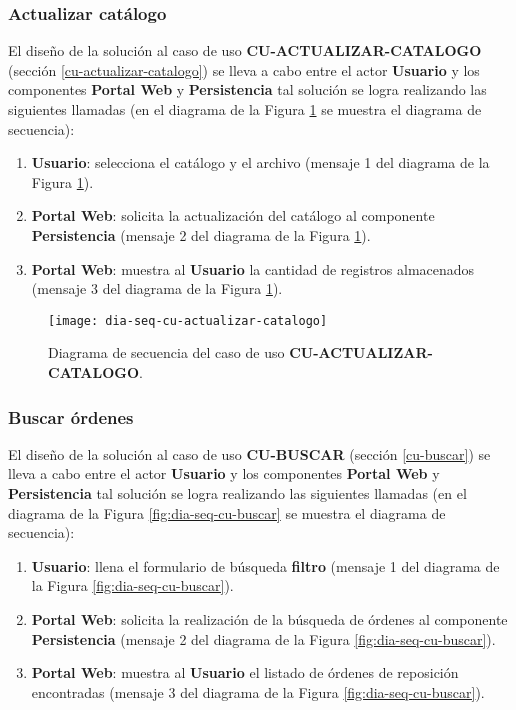 \subsubsection{Actualizar catálogo}
El diseño de la solución al caso de uso \textbf{CU-ACTUALIZAR-CATALOGO} (sección \ref{cu-actualizar-catalogo}) se lleva a cabo entre el actor \textbf{Usuario} y los componentes \textbf{Portal Web} y \textbf{Persistencia} tal solución se logra realizando las siguientes llamadas (en el diagrama de la Figura \ref{fig:dia-seq-cu-actualizar-catalogo} se muestra el diagrama de secuencia):
\begin{enumerate}
	\item \textbf{Usuario}: selecciona el catálogo y el archivo (mensaje 1 del diagrama de la Figura \ref{fig:dia-seq-cu-actualizar-catalogo}).
	\item \textbf{Portal Web}: solicita la actualización del catálogo al componente \textbf{Persistencia} (mensaje 2 del diagrama de la Figura \ref{fig:dia-seq-cu-actualizar-catalogo}).
	\item \textbf{Portal Web}: muestra al \textbf{Usuario} la cantidad de registros almacenados (mensaje 3 del diagrama de la Figura \ref{fig:dia-seq-cu-actualizar-catalogo}).
\end{enumerate}

\begin{figure}[h]
	\centering
	\texttt{[image: dia-seq-cu-actualizar-catalogo]}
	\caption{Diagrama de secuencia del caso de uso \textbf{CU-ACTUALIZAR-CATALOGO}.}
	\label{fig:dia-seq-cu-actualizar-catalogo}
\end{figure}

\subsubsection{Buscar órdenes}
El diseño de la solución al caso de uso \textbf{CU-BUSCAR} (sección \ref{cu-buscar}) se lleva a cabo entre el actor \textbf{Usuario} y los componentes \textbf{Portal Web} y \textbf{Persistencia} tal solución se logra realizando las siguientes llamadas (en el diagrama de la Figura \ref{fig:dia-seq-cu-buscar} se muestra el diagrama de secuencia):
\begin{enumerate}
	\item \textbf{Usuario}: llena el formulario de búsqueda \textbf{filtro} (mensaje 1 del diagrama de la Figura \ref{fig:dia-seq-cu-buscar}).
	\item \textbf{Portal Web}: solicita la realización de la búsqueda de órdenes al componente \textbf{Persistencia} (mensaje 2 del diagrama de la Figura \ref{fig:dia-seq-cu-buscar}).
	\item \textbf{Portal Web}: muestra al \textbf{Usuario} el listado de órdenes de reposición encontradas (mensaje 3 del diagrama de la Figura \ref{fig:dia-seq-cu-buscar}).
\end{enumerate}

